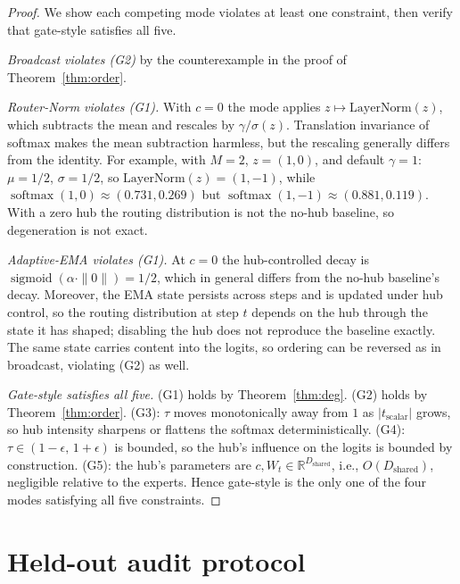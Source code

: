 \documentclass[10pt,twoside]{article}
\newcommand{\softmax}{\operatorname{softmax}}
\newcommand{\sigmoid}{\operatorname{sigmoid}}
\newcommand{\R}{\mathbb{R}}
\theoremstyle{definition}
\theoremstyle{plain}
\theoremstyle{remark}
\begin{document}
\begin{proof}
We show each competing mode violates at least one constraint, then verify that gate-style satisfies all five.

\emph{Broadcast violates (G2)} by the counterexample in the proof of Theorem~\ref{thm:order}.

\emph{Router-Norm violates (G1).} With $c = 0$ the mode applies $z \mapsto \mathrm{LayerNorm}(z)$, which subtracts the mean and rescales by $\gamma / \sigma(z)$. Translation invariance of softmax makes the mean subtraction harmless, but the rescaling generally differs from the identity. For example, with $M = 2$, $z = (1, 0)$, and default $\gamma = 1$: $\mu = 1/2$, $\sigma = 1/2$, so $\mathrm{LayerNorm}(z) = (1, -1)$, while $\softmax(1, 0) \approx (0.731, 0.269)$ but $\softmax(1, -1) \approx (0.881, 0.119)$. With a zero hub the routing distribution is not the no-hub baseline, so degeneration is not exact.

\emph{Adaptive-EMA violates (G1).} At $c = 0$ the hub-controlled decay is $\sigmoid(\alpha \cdot \|0\|) = 1/2$, which in general differs from the no-hub baseline's decay. Moreover, the EMA state persists across steps and is updated under hub control, so the routing distribution at step $t$ depends on the hub through the state it has shaped; disabling the hub does not reproduce the baseline exactly. The same state carries content into the logits, so ordering can be reversed as in broadcast, violating (G2) as well.

\emph{Gate-style satisfies all five.} (G1) holds by Theorem~\ref{thm:deg}. (G2) holds by Theorem~\ref{thm:order}. (G3): $\tau$ moves monotonically away from $1$ as $|t_{\text{scalar}}|$ grows, so hub intensity sharpens or flattens the softmax deterministically. (G4): $\tau \in (1 - \epsilon,\, 1 + \epsilon)$ is bounded, so the hub's influence on the logits is bounded by construction. (G5): the hub's parameters are $c, W_t \in \R^{D_{\text{shared}}}$, i.e., $O(D_{\text{shared}})$, negligible relative to the experts. Hence gate-style is the only one of the four modes satisfying all five constraints.
\end{proof}

\section{Held-out audit protocol}
\label{app:audit}
\end{document}
